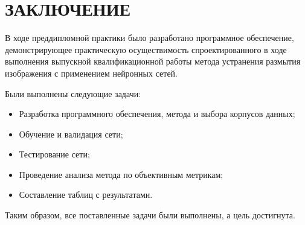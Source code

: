\part*{ЗАКЛЮЧЕНИЕ}


В ходе преддипломной практики было разработано программное обеспечение, демонстрирующее практическую осуществимость спроектированного в ходе выполнения выпускной квалификационной работы метода устранения размытия изображения с применением нейронных сетей.

Были выполнены следующие задачи:

\begin{itemize}
    \item Разработка программного обеспечения, метода и выбора корпусов данных;
    \item Обучение и валидация сети;
    \item Тестирование сети;
    \item Проведение анализа метода по объективным метрикам;
    \item Составление таблиц с результатами.
\end{itemize}

Таким образом, все поставленные задачи были выполнены, а цель достигнута.